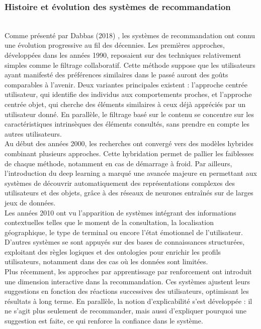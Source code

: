 \documentclass{article}
\begin{document}
\subsubsection{Histoire et évolution des systèmes de recommandation}
$ $\\
Comme présenté par Dabbas (2018) \cite{dabbas2018_reco}, les systèmes de recommandation ont connu une évolution progressive au fil des décennies. Les premières approches, développées dans les années 1990, reposaient sur des techniques relativement simples comme le filtrage collaboratif. Cette méthode suppose que les utilisateurs ayant manifesté des préférences similaires dans le passé auront des goûts comparables à l’avenir. 
Deux variantes principales existent : l’approche centrée utilisateur, qui identifie des individus aux comportements proches, et l’approche centrée objet, qui cherche des éléments similaires à ceux déjà appréciés par un utilisateur donné. En parallèle, le filtrage basé sur le contenu se concentre sur les caractéristiques intrinsèques des éléments consultés, sans prendre en compte les autres utilisateurs.\\
Au début des années 2000, les recherches ont convergé vers des modèles hybrides combinant plusieurs approches. Cette hybridation permet de pallier les faiblesses de chaque méthode, notamment en cas de démarrage à froid. Par ailleurs, l’introduction du deep learning a marqué une avancée majeure en permettant aux systèmes de découvrir automatiquement des représentations complexes des utilisateurs et des objets, grâce à des réseaux de neurones entraînés sur de larges jeux de données.\\
Les années 2010 ont vu l’apparition de systèmes intégrant des informations contextuelles telles que le moment de la consultation, la localisation géographique, le type de terminal ou encore l’état émotionnel de l’utilisateur. D’autres systèmes se sont appuyés sur des bases de connaissances structurées, exploitant des règles logiques et des ontologies pour enrichir les profils utilisateurs, notamment dans des cas où les données sont limitées.\\
Plus récemment, les approches par apprentissage par renforcement ont introduit une dimension interactive dans la recommandation. Ces systèmes ajustent leurs suggestions en fonction des réactions successives des utilisateurs, optimisant les résultats à long terme. En parallèle, la notion d’explicabilité s’est développée : il ne s’agit plus seulement de recommander, mais aussi d’expliquer pourquoi une suggestion est faite, ce qui renforce la confiance dans le système.\\
\end{document}
